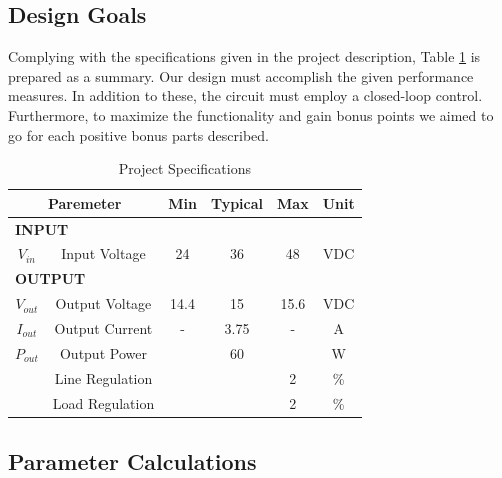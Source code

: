 \subsection{Design Goals}
Complying with the specifications given in the project description, Table \ref{tab:specs} is prepared as a summary. Our design must accomplish the given performance measures. In addition to these, the circuit must employ a closed-loop control. Furthermore, to maximize the functionality and gain bonus points we aimed to go for each positive bonus parts described.
\begin{table}[H]
\centering
\caption{Project Specifications}
\begin{tabular}{|c|c|c|c|c|c|}
\hline
\multicolumn{2}{|c|}{\textbf{Paremeter}}   & \textbf{Min}          & \textbf{Typical}      & \textbf{Max}          & \textbf{Unit}         \\ \hline
\multicolumn{2}{|l|}{\textbf{INPUT}}       & \multicolumn{1}{l|}{} & \multicolumn{1}{l|}{} & \multicolumn{1}{l|}{} & \multicolumn{1}{l|}{} \\ \hline
$V_{in}$  & Input Voltage                       & 24                    & 36                    & 48                    & VDC                   \\ \hline
\multicolumn{2}{|l|}{\textbf{OUTPUT}}      &                       &                       &                       &                       \\ \hline
$V_{out}$ & Output Voltage                      & 14.4                  & 15                    & 15.6                  & VDC                   \\ \hline
$I_{out}$ & Output Current                      & -                     & 3.75                  & -                     & A                     \\ \hline
$P_{out}$ & Output Power                        &                       & 60                    &                       & W                     \\ \hline
     & Line Regulation                     &                       &                       & 2                     & \%                    \\ \hline
     & Load Regulation                     &                       &                       & 2                     & \% 
     \hline
\label{tab:specs}
\end{tabular}
\end{table}
\subsection{Parameter Calculations}
